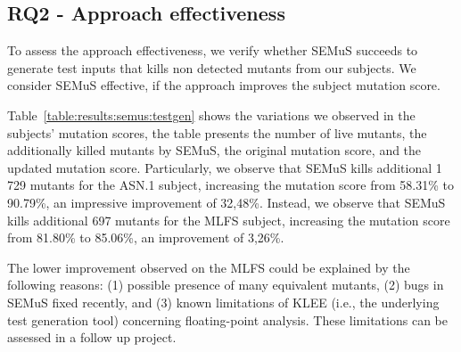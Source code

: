 \subsection{RQ2 - Approach effectiveness}


To assess the approach effectiveness, we verify whether SEMuS succeeds to generate test inputs that kills non detected mutants from our subjects. We consider SEMuS effective, if the approach improves the subject mutation score.

Table~\ref{table:results:semus:testgen} shows the variations we observed in the subjects' mutation scores, the table presents the number of live mutants, the additionally killed mutants by SEMuS, the original mutation score, and the updated mutation score.
Particularly, we observe that SEMuS kills additional 1\,729 mutants for the ASN.1 subject, increasing the mutation score from 58.31\% to 90.79\%, an impressive improvement of 32,48\%.
Instead, we observe that SEMuS kills additional 697 mutants for the MLFS subject, increasing the mutation score from 81.80\% to 85.06\%, an improvement of 3,26\%.

The lower improvement observed on the MLFS could be explained by the following reasons: (1) possible presence of many equivalent mutants, (2) bugs in SEMuS fixed recently, and (3) known limitations of KLEE (i.e., the underlying test generation tool) concerning floating-point analysis. These limitations can be assessed in a follow up project.




